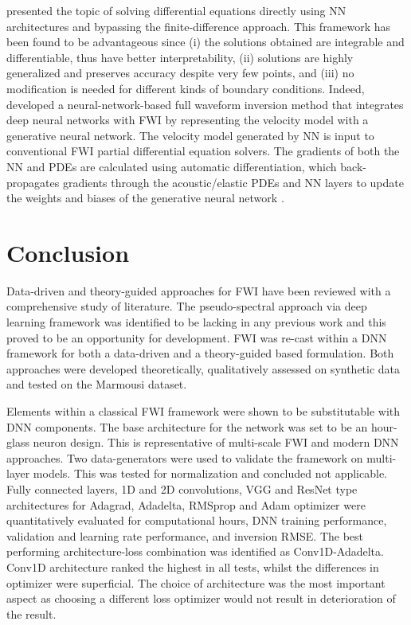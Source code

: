 \cite{Yadav2015} presented the topic of solving differential equations directly using NN architectures and bypassing the finite-difference approach. This framework has been found to be advantageous since (i) the solutions obtained are integrable and differentiable, thus have better interpretability, (ii) solutions are highly generalized and preserves accuracy despite very few points, and (iii) no modification is needed for different kinds of boundary conditions. Indeed, \cite{Zhu2020} developed a neural-network-based full waveform inversion method that integrates deep neural networks with FWI by representing the velocity model with a generative neural network. The velocity model generated by NN is input to conventional FWI partial differential equation solvers. The gradients of both the NN and PDEs are calculated using automatic differentiation, which back-propagates gradients through the acoustic/elastic PDEs and NN layers to update the weights and biases of the generative neural network \citep{Zhu2020}.



\section{Conclusion}
Data-driven and theory-guided approaches for FWI have been reviewed with a comprehensive study of literature. 
The pseudo-spectral approach via deep learning framework was identified to be lacking in any previous work and this proved to be an opportunity for development. FWI was re-cast within a DNN framework for both a data-driven and a theory-guided based formulation. Both approaches were developed theoretically, qualitatively assessed on synthetic data and tested on the Marmousi dataset. 

Elements within a classical FWI framework were shown to be substitutable with DNN components. The base architecture for the network was set to be an hour-glass neuron design. This is representative of multi-scale FWI and modern DNN approaches. Two data-generators were used to validate the framework on multi-layer models. This was tested for normalization and concluded not applicable. Fully connected layers, 1D and 2D convolutions, VGG and ResNet type architectures for Adagrad, Adadelta, RMSprop and Adam optimizer were quantitatively evaluated for computational hours, DNN training performance, validation and learning rate performance, and inversion RMSE. The best performing architecture-loss combination was identified as Conv1D-Adadelta. Conv1D architecture ranked the highest in all tests, whilst the differences in optimizer were superficial. The choice of architecture was the most important aspect as choosing a different loss optimizer would not result in deterioration of the result.

